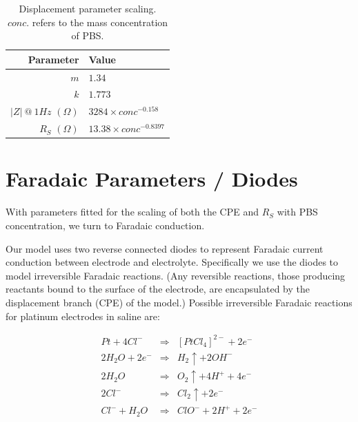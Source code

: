 \documentclass[journal, a4paper]{IEEEtran}
\begin{document}
\begin{table}
    \caption{Displacement parameter scaling.\\ $conc.$ refers to the mass concentration of PBS.}
    \label{tab:CPEparams}
    \begin{center}
        \begin{tabular}{r | l}
            Parameter & Value \\
            \hline
            $m$ & $1.34$ \\
            $k$ & $1.773$\\
            $|Z|\: @\: 1Hz$ $(\Omega)$& $3284 \times conc^{-0.158}$ \\
            $R_{S}$ $(\Omega)$& $13.38 \times conc^{-0.8397} $\\
        \end{tabular}
    \end{center}
\end{table}



\section{Faradaic Parameters {\color{blue}/ Diodes}}
\label{sect:faradaic}

With parameters fitted for the scaling of both the CPE and $R_{S}$ with PBS concentration, we turn to Faradaic conduction.

Our model uses two reverse connected diodes to represent Faradaic current conduction between electrode and electrolyte. Specifically we use the diodes to model irreversible Faradaic reactions. (Any reversible reactions, those producing reactants bound to the surface of the electrode, are encapsulated by the displacement branch (CPE) of the model.)
Possible irreversible Faradaic reactions for platinum electrodes in saline are:

\begin{align}
    Pt + 4Cl^{-} &\Rightarrow& [PtCl_{4}]^{2-} + 2 e^{-} \label{eqn:ptCl}\\
    2H_{2}O + 2 e^{-} &\Rightarrow& H_{2}\uparrow + 2OH^{-} \label{eqn:H20}\\
    2H_{2}O &\Rightarrow& O_{2}\uparrow + 4H^{+} + 4e^{-} \label{eqn:2H20}\\
    2Cl^{-} &\Rightarrow& Cl_{2}\uparrow + 2e^{-} \label{eqn:Cl} \\
    Cl^{-} + H_{2}O &\Rightarrow& ClO^{-} + 2H^{+} + 2e^{-} \label{eqn:ClH20}
\end{align}
\end{document}
